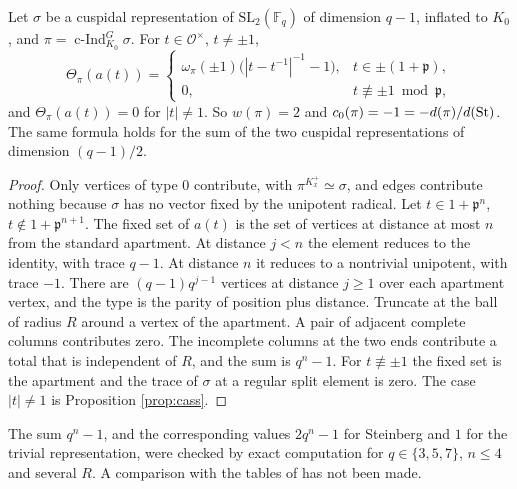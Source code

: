 \begin{proposition}\label{prop:sc}Let $\sigma$ be a cuspidal representation of $\mathrm{SL}_2(\mathbb F_q)$ of dimension $q-1$, inflated to $K_0$, and $\pi=\operatorname{c-Ind}_{K_0}^G\sigma$. For $t\in\mathcal O^\times$, $t\ne\pm1$,
\[
\Theta_\pi(a(t))=\begin{cases}\omega_\pi(\pm1)\bigl(|t-t^{-1}|^{-1}-1\bigr),&t\in\pm(1+\mathfrak p),\\ 0,&t\not\equiv\pm1\bmod\mathfrak p,\end{cases}
\]
and $\Theta_\pi(a(t))=0$ for $|t|\ne1$. So $w(\pi)=2$ and $c_0(\pi)=-1=-d(\pi)/d(\operatorname{St})$. The same formula holds for the sum of the two cuspidal representations of dimension $(q-1)/2$.
\end{proposition}
\begin{proof}
Only vertices of type $0$ contribute, with $\pi^{K_x^+}\simeq\sigma$, and edges contribute nothing because $\sigma$ has no vector fixed by the unipotent radical. Let $t\in1+\mathfrak p^n$, $t\notin1+\mathfrak p^{n+1}$. The fixed set of $a(t)$ is the set of vertices at distance at most $n$ from the standard apartment. At distance $j<n$ the element reduces to the identity, with trace $q-1$. At distance $n$ it reduces to a nontrivial unipotent, with trace $-1$. There are $(q-1)q^{j-1}$ vertices at distance $j\ge1$ over each apartment vertex, and the type is the parity of position plus distance. Truncate at the ball of radius $R$ around a vertex of the apartment. A pair of adjacent complete columns contributes zero. The incomplete columns at the two ends contribute a total that is independent of $R$, and the sum is $q^n-1$. For $t\not\equiv\pm1$ the fixed set is the apartment and the trace of $\sigma$ at a regular split element is zero. The case $|t|\ne1$ is Proposition \ref{prop:cass}.
\end{proof}
The sum $q^n-1$, and the corresponding values $2q^n-1$ for Steinberg and $1$ for the trivial representation, were checked by exact computation for $q\in\{3,5,7\}$, $n\le4$ and several $R$. A comparison with the tables of \cite{SS68,ADSS11} has not been made.


